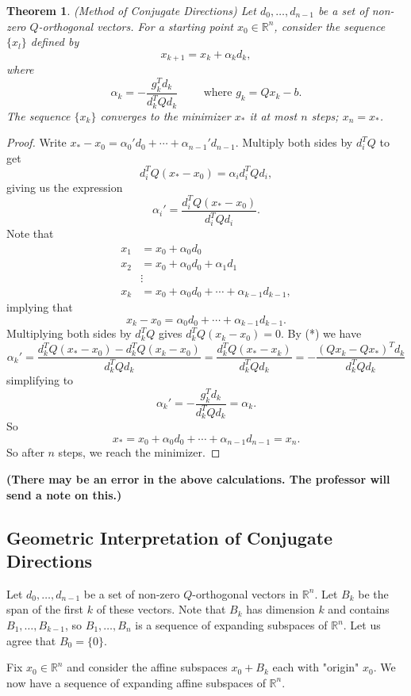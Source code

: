 \documentclass[11pt]{article}
\newcommand{\R}{\mathbb{R}}
\newtheorem{theorem}{Theorem}[subsection]
\begin{document}
\begin{theorem}
(Method of Conjugate Directions)
Let $d_0, \dots, d_{n-1}$ be a set of non-zero $Q$-orthogonal vectors. For a starting point $x_0 \in \R^n$, consider the sequence $\{x_l\}$ defined by 
\[
x_{k+1} = x_k + \alpha_k d_k,
\]
where
\[
\alpha_k = -\frac{g_k^Td_k}{d_k^TQd_k} \qquad \text{ where } g_k = Qx_k - b.
\]
The sequence $\{x_k\}$ converges to the minimizer $x_*$ it at most $n$ steps; $x_n = x_*$.
\end{theorem}
\begin{proof}
Write $x_* - x_0 = \alpha_0' d_0 + \cdots + \alpha_{n-1}'d_{n-1}$. Multiply both sides by $d_i^TQ$ to get
\[
d_i^TQ(x_* - x_0) = \alpha_i d_i^TQd_i,
\]
giving us the expression
\[
\tag{*}
\alpha_i' = \frac{d_i^TQ(x_*-x_0)}{d_i^TQd_i}.
\]
Note that
\begin{align*}
x_1 &= x_0 + \alpha_0 d_0 \\
x_2 &= x_0 + \alpha_0 d_0 + \alpha_1 d_1 \\
&\vdots \\
x_k &= x_0 + \alpha_0 d_0 + \cdots + \alpha_{k-1}d_{k-1},
\end{align*}
implying that
\[
x_k - x_0 = \alpha_0 d_0 + \cdots + \alpha_{k-1}d_{k-1}.
\]
Multiplying both sides by $d_k^TQ$ gives $d_k^TQ(x_k-x_0) = 0$. By (*) we have
\[
\alpha_k' = \frac{d_k^T Q(x_* - x_0) - d_k^TQ(x_k - x_0)}{d_k^TQd_k} = \frac{d_k^TQ(x_* - x_k)}{d_k^TQd_k} = -\frac{(Qx_k - Qx_*)^T d_k}{d_k^TQd_k}
\]
simplifying to
\[
\alpha_k' = -\frac{g_k^T d_k}{d_k^TQd_k} = \alpha_k.
\]
So
\[
x_* = x_0 + \alpha_0 d_0 + \cdots + \alpha_{n-1}d_{n-1} = x_n.
\]
So after $n$ steps, we reach the minimizer.
\end{proof}
\textbf{(There may be an error in the above calculations. The professor will send a note on this.)}

\subsection{Geometric Interpretation of Conjugate Directions}

Let $d_0, \dots, d_{n-1}$ be a set of non-zero $Q$-orthogonal vectors in $\R^n$. Let $B_k$ be the span of the first $k$ of these vectors. Note that $B_k$ has dimension $k$ and contains $B_1, \dots, B_{k-1}$, so $B_1, \dots, B_n$ is a sequence of expanding subspaces of $\R^n$. Let us agree that $B_0 = \{0\}$.

Fix $x_0 \in \R^n$ and consider the affine subspaces $x_0 + B_k$ each with "origin" $x_0$. We now have a sequence of expanding affine subspaces of $\R^n$.
\end{document}

